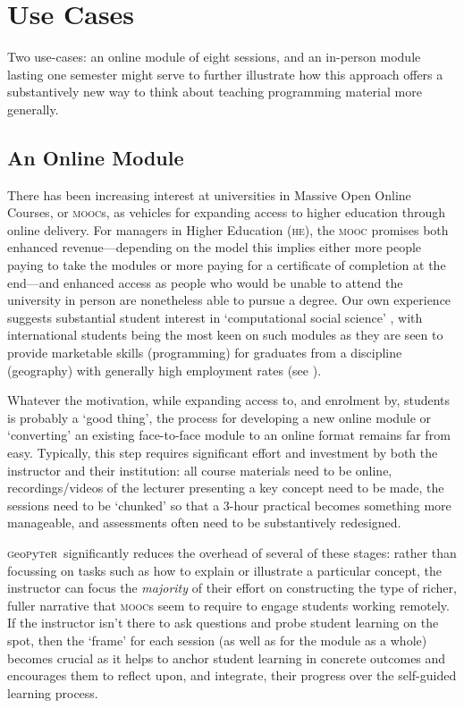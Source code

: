 \documentclass[letter, 11pt,titlepage]{article}
\newcommand{\gp}{\textsc{g}eo\textsc{p}y\textsc{t}e\textsc{r}~\/}
\begin{document}
\section{Use Cases}\label{uses}

Two use-cases: an online module of eight sessions, and an in-person module
lasting one semester might serve to further illustrate how this approach offers
a substantively new way to think about teaching programming material more
generally.

\subsection{An Online Module}\label{an-online-module}

There has been increasing interest at universities in Massive Open Online
Courses, or \textsc{mooc}s, as vehicles for expanding access to higher education
through online delivery. For managers in Higher Education (\textsc{he}), the \textsc{mooc} promises both
enhanced revenue---depending on the model this implies either more people paying
to take the modules or more paying for a certificate of completion at the
end---and enhanced access as people who would be unable to attend the university
in person are nonetheless able to pursue a degree. Our own experience suggests
substantial student interest in `computational social science'
\citep{Lazer2009}, with international students being the most keen on such
modules as they are seen to provide marketable skills (programming) for
graduates from a discipline (geography) with generally high employment rates
(see \citeauthor{rgs2017} \citeyear{rgs2017}).

Whatever the motivation, while expanding access to, and enrolment by, students
is probably a `good thing', the process for developing a new online module or
`converting' an existing face-to-face module to an online format remains far
from easy. Typically, this step requires significant effort and investment by
both the instructor and their institution: all course materials need to be
online, recordings/videos of the lecturer presenting a key concept need to be
made, the sessions need to be `chunked' so that a 3-hour practical becomes
something more manageable, and assessments often need to be substantively
redesigned.

\gp significantly reduces the overhead of several of these stages: rather than
focussing on tasks such as how to explain or illustrate a particular concept,
the instructor can focus the \emph{majority} of their effort on constructing the
type of richer, fuller narrative that \textsc{mooc}s seem to require to engage
students working remotely. If the instructor isn't there to ask questions and
probe student learning on the spot, then the `frame' for each session (as well
as for the module as a whole) becomes crucial as it helps to anchor student
learning in concrete outcomes and encourages them to reflect upon, and
integrate, their progress over the self-guided learning process.
\end{document}
